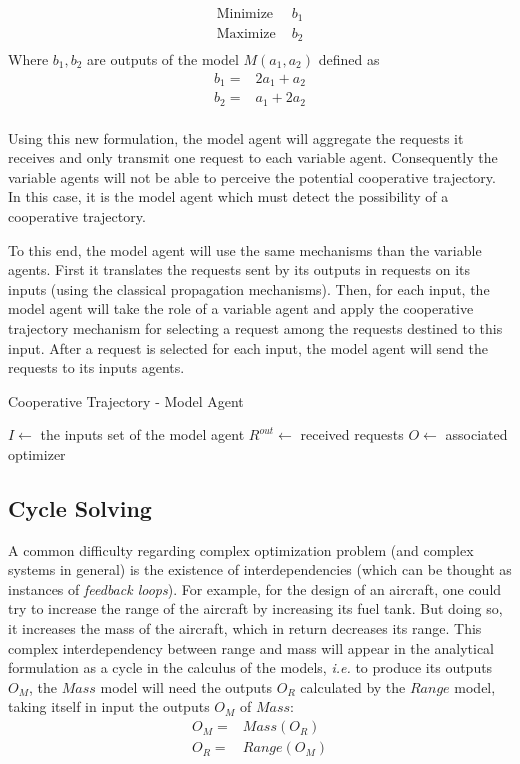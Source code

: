\begin{align*}
\text{Minimize } &b_1\\
\text{Maximize } &b_2\\
\end{align*}
Where $b_1,b_2$ are outputs of the model $M(a_1,a_2)$ defined as
\begin{align*}
b_1 = &2a_1 + a_2\\
b_2 = &a_1 + 2a_2\\
\end{align*}

Using this new formulation, the model agent will aggregate the requests it receives and only transmit one request to each variable agent. Consequently the variable agents will not be able to perceive the potential cooperative trajectory. In this case, it is the model agent which must detect the possibility of a cooperative trajectory.

To this end, the model agent will use the same mechanisms than the variable agents. First it translates the requests sent by its outputs in requests on its inputs (using the classical propagation mechanisms). Then, for each input, the model agent will take the role of a variable agent and apply the cooperative trajectory mechanism for selecting a request among the requests destined to this input. After a request is selected for each input, the model agent will send the requests to its inputs agents.

\begin{algorithm}
\caption{Cooperative Trajectory - Model Agent}
\label{algo_cooperative_trajectory_model}
	$I \leftarrow$ the inputs set of the model agent\;
	$R^{out} \leftarrow$ received requests\;
	$O \leftarrow$ associated optimizer\;
\end{algorithm}

\subsection{Cycle Solving}\label{NCS_cycles}

A common difficulty regarding complex optimization problem (and complex systems in general) is the existence of interdependencies (which can be thought as instances of \emph{feedback loops}). For example, for the design of an aircraft, one could try to increase the range of the aircraft by increasing its fuel tank. But doing so, it increases the mass of the aircraft, which in return decreases its range. This complex interdependency between range and mass will appear in the analytical formulation as a cycle in the calculus of the models, \emph{i.e.} to produce its outputs $O_M$, the $Mass$ model will need the outputs $O_R$ calculated by the $Range$ model, taking itself in input the outputs $O_M$ of $Mass$:
\begin{align*}
O_M = &Mass(O_R)\\
O_R = &Range(O_M)
\end{align*}

